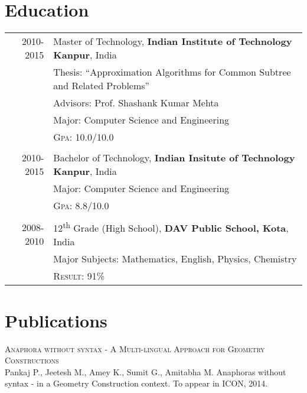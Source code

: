 \documentclass[a4paper,10pt]{article}
\begin{document}
\section{Education}
\begin{longtable}{rl}	
 2010-2015\footnotemark[1] & Master of Technology, \textbf{Indian Institute of Technology Kanpur}, India\\
& Thesis: ``Approximation Algorithms for Common Subtree and Related Problems'' \\
& \small Advisors: Prof. Shashank Kumar Mehta\\
& \normalsize Major: Computer Science and Engineering\\
& \textsc{Gpa}: 10.0/10.0\\&\\
2010-2015\footnotemark[1] & Bachelor of Technology, \normalsize\textbf{Indian Insitute of Technology Kanpur}, India\\
&\normalsize Major: Computer Science and Engineering\\
& \textsc{Gpa}: 8.8/10.0\\&\\
2008-2010 & 12\textsuperscript{th} Grade (High School), \normalsize\textbf{DAV Public School, Kota}, India\\
&\normalsize Major Subjects: Mathematics, English, Physics, Chemistry\\
& \textsc{Result}: 91\%\\
\end{longtable}

\section{Publications}
\textsc{Anaphora without syntax - A Multi-lingual Approach for Geometry Constructions}\\
  {\small Pankaj P., Jeetesh M., Amey K., Sumit G., Amitabha M. Anaphoras without syntax - in a Geometry Construction context. To appear in ICON, 2014.}
       
\end{document}
